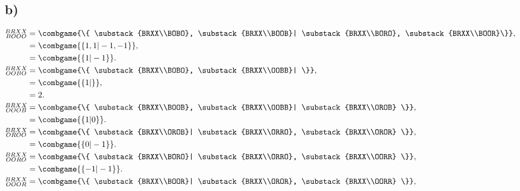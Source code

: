 \documentclass[11pt,twoside]{article}
\begin{document}
\subsection{b)}
\begin{align*}
    \substack{BRXX\\BOOO} &= \combgame{\{ \substack{BRXX\\BOBO}, \substack{BRXX\\BOOB}| \substack{BRXX\\BORO}, \substack{BRXX\\BOOR}\}}, \\
    &= \combgame{\{ 1, 1| -1, -1\}}, \\
    &= \combgame{\{ 1| -1\}}. \\
    \substack{BRXX\\OOBO} &= \combgame{\{ \substack{BRXX\\BOBO}, \substack{BRXX\\OOBB}| \}}, \\
    &= \combgame{\{ 1| \}}, \\
    &= 2. \\
    \substack{BRXX\\OOOB} &= \combgame{\{ \substack{BRXX\\BOOB}, \substack{BRXX\\OOBB}| \substack{BRXX\\OROB} \}}, \\
    &= \combgame{\{ 1| 0 \}}. \\
    \substack{BRXX\\OROO} &= \combgame{\{ \substack{BRXX\\OROB}| \substack{BRXX\\ORRO}, \substack{BRXX\\OROR} \}}, \\
    &= \combgame{\{ 0| -1 \}}. \\
    \substack{BRXX\\OORO} &= \combgame{\{ \substack{BRXX\\BORO}| \substack{BRXX\\ORRO}, \substack{BRXX\\OORR} \}}, \\
    &= \combgame{\{ -1| -1 \}}. \\
    \substack{BRXX\\OOOR} &= \combgame{\{ \substack{BRXX\\BOOR}| \substack{BRXX\\OROR}, \substack{BRXX\\OORR} \}}, \\

\end{align*}
\end{document}
